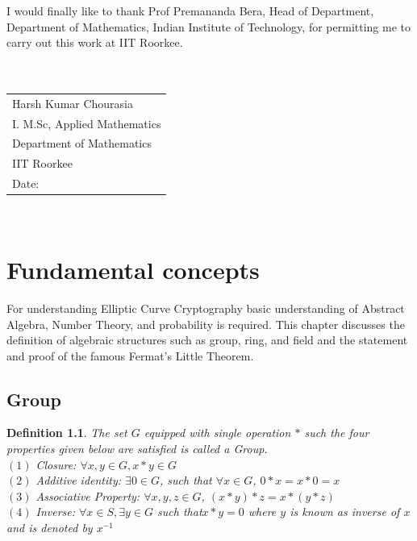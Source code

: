 \documentclass[a4paper,12pt]{report}
\newtheorem{definition}{Definition}
\begin{document}
I would finally like to thank Prof Premananda Bera, Head of Department, Department of Mathematics, Indian Institute of Technology, for permitting me to carry out this work at IIT Roorkee.\\\\\\
\begin{tabular}{l}
	Harsh Kumar Chourasia        \\
	I. M.Sc, Applied Mathematics \\
	Department of Mathematics    \\
	IIT Roorkee                  \\
	Date:                        \\
\end{tabular}

\cleardoublepage


\tableofcontents
\thispagestyle{empty}
\cleardoublepage
\
\setcounter{page}{1}

\chapter{Fundamental concepts}
\large{
	For understanding Elliptic Curve Cryptography basic understanding of Abstract Algebra, Number Theory, and probability is required. This chapter discusses the definition of algebraic structures such as group, ring, and field and the statement and proof of the famous Fermat's Little Theorem. 
}\\
\section{Group}
\begin{definition}
	The set  $G$ equipped with single operation $*$ such the four  properties given below are satisfied is called a Group.\\
	$(1)$ Closure: $\forall x,y \in G, x*y \in G$ \\
	$(2)$ Additive identity: $\exists 0 \in G$, such that $ \forall x \in G$, $ 0*x=x*0=x$\\
	$(3)$ Associative Property: $ \forall x,y,z \in G$, $(x*y)*z=x*(y*z)$ \\
	$(4)$ Inverse: $ \forall x \in S, \exists y \in G$ such that$x*y=0$ where $y$ is known as inverse of $x$ and is denoted by $x^{-1}$
\end{definition}
\cleardoublepage
\end{document}
